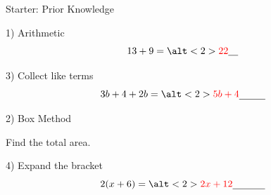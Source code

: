 \documentclass{beamer}
\newcommand{\ablank}[1]{%
  \alt<2>{\textcolor{red}{#1}}{\underline{\phantom{#1}}}%
}
\newcommand{\ashow}[1]{\uncover<2->{\textcolor{red}{\small #1}}}
\newcommand{\ashowq}[1]{\alt<2->{\textcolor{red}{\small #1}}{?}}
\begin{document}
\begin{frame}{Starter: Prior Knowledge}
\begin{minipage}[t]{0.48\textwidth}

\begin{block}{1) Arithmetic}
\Large
\[
13 + 9 = \ablank{22}
\]
\end{block}

\vspace{6.2em}

\begin{block}{3) Collect like terms}
\Large
\[
3b + 4 + 2b = \ablank{5b+4}
\]
\end{block}

\end{minipage}\hfill
\begin{minipage}[t]{0.48\textwidth}

\begin{block}{2) Box Method}
\centering
{}

\vspace{0.4em}
Find the total area. \ashow{Total area $= 32$}

\end{block}

\vspace{0.6em}

\begin{block}{4) Expand the bracket}
\Large
\[
2(x+6) = \ablank{2x+12}
\]
\end{block}

\end{minipage}
\end{frame}
\end{document}
